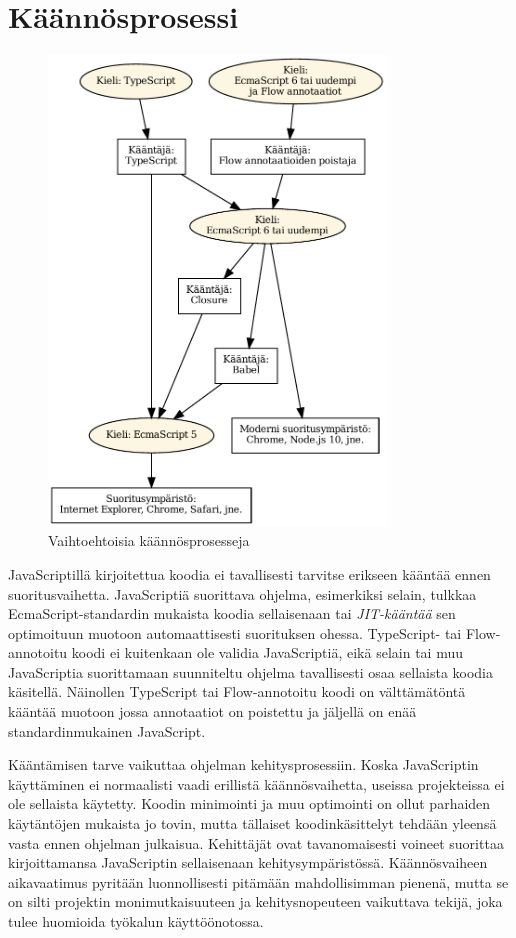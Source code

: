 \section{Käännösprosessi}
\begin{figure}[!htb]
\centering
\includegraphics[width=0.8\textwidth]{images/compilation.pdf}
\caption{Vaihtoehtoisia käännösprosesseja}
\label{fig:compilation}
\end{figure}
JavaScriptillä kirjoitettua koodia ei tavallisesti tarvitse
erikseen kääntää ennen suoritusvaihetta. JavaScriptiä suorittava ohjelma,
esimerkiksi selain, tulkkaa EcmaScript-standardin mukaista koodia
sellaisenaan tai \textit{JIT-kääntää} sen optimoituun muotoon automaattisesti
suorituksen ohessa. TypeScript- tai Flow-annotoitu koodi ei kuitenkaan
ole validia JavaScriptiä, eikä selain tai muu JavaScriptia suorittamaan
suunniteltu ohjelma tavallisesti osaa sellaista koodia käsitellä.
Näinollen TypeScript tai Flow-annotoitu koodi on välttämätöntä kääntää muotoon jossa
annotaatiot on poistettu ja jäljellä on enää standardinmukainen JavaScript.

Kääntämisen tarve vaikuttaa ohjelman kehitysprosessiin.
Koska JavaScriptin käyttäminen ei normaalisti vaadi erillistä
käännösvaihetta, useissa projekteissa ei ole sellaista käytetty. Koodin
minimointi ja muu optimointi on ollut parhaiden käytäntöjen mukaista jo
tovin, mutta tällaiset koodinkäsittelyt tehdään yleensä vasta ennen ohjelman
julkaisua. Kehittäjät ovat tavanomaisesti voineet suorittaa kirjoittamansa
JavaScriptin sellaisenaan kehitysympäristössä. Käännösvaiheen aikavaatimus
pyritään luonnollisesti pitämään mahdollisimman pienenä, mutta se on silti
projektin monimutkaisuuteen ja kehitysnopeuteen vaikuttava tekijä, joka
tulee huomioida työkalun käyttöönotossa.

